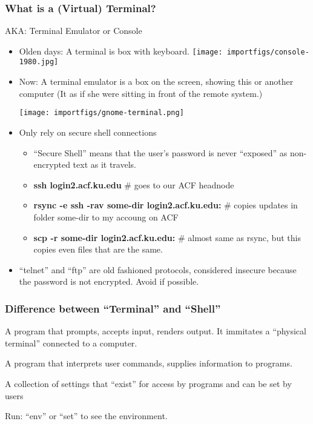 \documentclass[English]{beamer}
\begin{document}
\begin{frame}[allowframebreaks]
  \frametitle{What is a (Virtual) Terminal?}
  AKA: Terminal Emulator or Console
  \begin{itemize}
  \item Olden days: A terminal is box with keyboard.
\texttt{[image: importfigs/console-1980.jpg]}
  \item Now: A terminal emulator is a box on the screen, showing this
    or another computer (It as if she were sitting in front
    of the remote system.)

\texttt{[image: importfigs/gnome-terminal.png]} 

  \item Only rely on secure shell connections
    \begin{itemize}
    \item ``Secure Shell'' means that the user's
      password is never ``exposed'' as non-encrypted text as it travels. 
    \item \textbf{ssh login2.acf.ku.edu} \# goes to our ACF headnode
    \item \textbf{rsync -e ssh -rav some-dir login2.acf.ku.edu:} \# copies
      updates in folder some-dir to my accoung on ACF
    \item \textbf{scp -r some-dir login2.acf.ku.edu: }\# almost same as
      rsync, but this copies even files that are the same.
    \end{itemize}
  \item  ``telnet'' and ``ftp'' are old fashioned protocols,
    considered insecure because the password is not encrypted. Avoid
    if possible. 
  \end{itemize}
\end{frame}



\begin{frame}
  \frametitle{Difference between ``Terminal'' and ``Shell''}
  
    \begin{description}
      \item[terminal] A program that prompts, accepts input, renders
        output. It immitates a ``physical terminal'' connected to a computer.
        
      \item[shell] A program that interprets user commands, supplies
        information to programs.
        
      \item[environment] A collection of settings that ``exist'' for
        access by programs and can be set by users
      \item  Run: ``env'' or ``set'' to see the environment.
    \end{description}
\end{frame}
\end{document}
